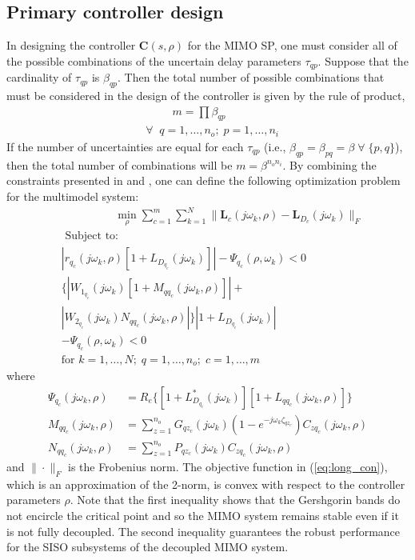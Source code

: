 \documentclass[A4, 10pt, conference]{ieeeconf}
\renewcommand{\vec}[1]{\mathbf{#1}}
\begin{document}
\subsection{Primary controller design}
In designing the controller $\vec{C}(s,\rho)$ for the MIMO SP, one must consider all of the possible combinations of the uncertain delay parameters $\tau_{qp}$.  Suppose that the cardinality of  $\tau_{qp}$ is $\beta_{qp}$. Then the total number of possible combinations that must be considered in the design of the controller is given by the rule of product,
\begin{align}
&\hspace{1cm} m=\prod \beta_{qp} \nonumber \\
&\forall \;\; q=1,\ldots,n_o;\;p=1,\ldots,n_i
\end{align}
If the number of uncertainties are equal for each $\tau_{qp}$ (i.e., $\beta_{qp}=\beta_{pq}=\beta\; \forall \; \{p,q\}$), then the total number of combinations will be $m=\beta^{n_o n_i}$. By combining the constraints presented in  and , one can define the following optimization problem for the multimodel system:
\begin{align}\label{eq:long_con}
&\hspace{2cm} \min_\rho \sum_{c=1}^{m} \sum_{k=1}^N \|\mathbf{L}_c(j\omega_k,\rho)-\mathbf{L}_{D_{c}}(j\omega_k)\|_F \nonumber\\
&\mbox{ Subject to: } \nonumber\\
&|r_{q_{c}}(j\omega_k,\rho)[1+L_{D_{q_{c}}}(j\omega_k)]|-\Psi_{q_{c}}(\rho,\omega_k)<0 \nonumber\\
&
\{|W_{1_{q_{c}}}(j\omega_k)[1+M_{qq_{c}}(j\omega_k,\rho)]|+ \nonumber \\
&|W_{2_{q_{c}}}(j\omega_k)N_{qq_{c}}(j\omega_k,\rho)|\} 
|1+L_{D_{q_{c}}}(j\omega_k)| \nonumber \\ &-\Psi_{q_{c}}(\rho,\omega_k)<0 \nonumber\\
&\mbox{for } k=1,\ldots,N;\;  q=1,\ldots,n_o; \; c=1,\ldots,m
\end{align}
where 
\begin{align*}
\Psi_{q_{c}}(j\omega_k,\rho)&=R_e\{[1+L^*_{D_{q_{c}}}(j\omega_k)][1+L_{qq_{c}}(j\omega_k,\rho)]\} \\
M_{qq_{c}}(j\omega_k,\rho)&=\sum_{z=1}^{n_o} G_{qz_{c}}(j\omega_k)(1-e^{-j\omega_k \zeta_{qz_{c}}})C_{zq_{c}}(j\omega_k,\rho) \\
N_{qq_{c}}(j\omega_k,\rho)&=\sum_{z=1}^{n_o} P_{qz_{c}}(j\omega_k)C_{zq_{c}}(j\omega_k,\rho)
\end{align*}
and $\|\cdot\|_{F}$ is the Frobenius norm. The objective function in (\ref{eq:long_con}), which is an approximation of the 2-norm,  is convex with respect to the controller parameters $\rho$. Note that the first inequality shows that the Gershgorin bands do not encircle the critical point and so the MIMO system remains stable even if it is not fully decoupled. The second inequality guarantees the robust performance for the SISO subsystems of the decoupled MIMO system. %
\end{document}
